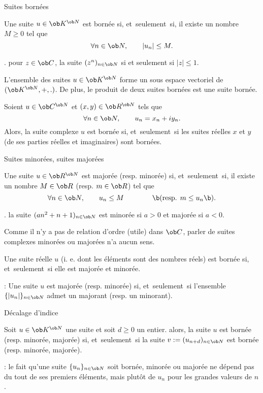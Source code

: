 \Concept [] Suites bornées

\Definition []  Une suite $u\in\ob K^{\ob N}$ est bornée si, et~seulement~si, il existe un nombre $M\ge0$ tel que 
$$
\forall n\in\ob N ,\qquad  |u_n|\le M .
$$

\Exemple. pour $z\in\ob C$, la suite $(z^n)_{n\in\ob N}$ si et seulement si $|z|\le 1$. 
\bigskip

\Propriete [] L'ensemble des suites $u\in\ob K^{\ob N}$ forme un sous espace vectoriel de $(\ob K^{\ob N},+,.)$. 
De plus, le produit de deux suites bornées est une suite bornée. 
\bigskip

\Propriete []  Soient $u\in\ob C^{\ob N}$ et $(x,y)\in\ob R^{\ob N}$ tels que 
$$
\forall n\in\ob N,\qquad u_n=x_n+iy_n.
$$
Alors, la suite complexe $u$ est bornée si, et~seulement~si les suites réelles $x$ et $y$ (de ses parties réelles et imaginaires) 
sont bornées. 
\bigskip


\Concept [] Suites minorées, suites majorées

\Definition []  Une suite $u\in\ob R^{\ob N}$ est majorée (resp. minorée) si, et~seulement~si, 
il existe un nombre $M\in\ob R$ (resp. $m\in\ob R$) tel que 
$$
\forall n\in\ob N ,\qquad  u_n\le M \qquad \qquad\b(\mbox{resp. } m\le u_n\b).
$$

\Exemple. la suite $(a n^2+n+1)_{n\in\ob N}$ est minorée si $a> 0$ et majorée si $a< 0$. 
\bigskip

 Comme il n'y a pas de relation d'ordre (utile) dans $\ob C$, 
parler de suites complexes minorées ou majorées n'a aucun sens. 
\bigskip

\Propriete []  Une suite réelle $u$ (i. e. dont les éléments sont des nombres réels) est bornée si, et~seulement~si elle est majorée et minorée. 
\bigskip

\Remarque : Une suite $u$ est majorée (resp. minorée) si, et~seulement~si l'ensemble $\{|u_n|\}_{n\in\ob N}$ 
admet un majorant (resp. un minorant). 
\bigskip

\Concept [] Décalage d'indice

\Propriete []  Soit $u\in\ob K^{\ob N}$ une suite et soit $d\ge0$ un entier. alors, la suite $u$ est bornée (resp. minorée, majorée) si, et~seulement~si 
la suite $v:=(u_{n+d})_{n\in\ob N}$ est bornée (resp. minorée, majorée). 
\bigskip

\Remarque : le fait qu'une suite $\{u_n\}_{n\in\ob N}$ soit bornée, minorée ou majorée ne dépend pas du tout de ses premiers éléments, mais plutôt de $u_n$ pour les grandes valeurs de $n$. 
\bigskip


